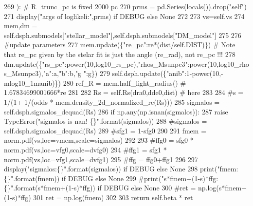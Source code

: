 \begin{DoxyCode}
269     ): \textcolor{comment}{# R\_trunc\_pc is fixed 2000 pc}
270         prms = pd.Series(locals()).drop(\textcolor{stringliteral}{"self"})
271         display(\textcolor{stringliteral}{"args of loglikeli:"},prms) \textcolor{keywordflow}{if} DEBUG \textcolor{keywordflow}{else} \textcolor{keywordtype}{None}
272         
273         vs=self.vs
274         mem,dm = self.dsph.submodels[\textcolor{stringliteral}{"stellar\_model"}],self.dsph.submodels[\textcolor{stringliteral}{"DM\_model"}]
275         
276         \textcolor{comment}{#update parameters}
277         mem.update(\{\textcolor{stringliteral}{"re\_pc"}:re*(dist/self.DIST)\}) \textcolor{comment}{# Note that re\_pc given by the stelar fit is just the
       angle (re\_rad), not re\_pc !!!}
278         dm.update(\{\textcolor{stringliteral}{"rs\_pc"}:power(10,log10\_rs\_pc),\textcolor{stringliteral}{"rhos\_Msunpc3"}:power(10,log10\_rhos\_Msunpc3),\textcolor{stringliteral}{"a"}:a,\textcolor{stringliteral}{"b"}:b,\textcolor{stringliteral}{"g
      "}:g\})
279         self.dsph.update(\{\textcolor{stringliteral}{"anib"}:1-power(10,-mlog10\_1manib)\})
280         ref\_R = mem.half\_light\_radius() \textcolor{comment}{# 1.67834699001666*re}
281         
282         Rs = self.Rs(dra0,dde0,dist) \textcolor{comment}{# here }
283         
284         \textcolor{comment}{#s = 1/(1+ 1/(odds * mem.density\_2d\_normalized\_re(Rs)))}
285         sigmalos = self.dsph.sigmalos\_dequad(Rs)
286         \textcolor{keywordflow}{if} np.any(np.isnan(sigmalos)):
287             \textcolor{keywordflow}{raise} TypeError(\textcolor{stringliteral}{"sigmalos is nan! \{\}"}.format(sigmalos))
288         \textcolor{comment}{#sigmalos = self.dsph.sigmalos\_dequad(Rs)}
289         \textcolor{comment}{#sfg1 = 1-sfg0}
290         
291         fmem = norm.pdf(vs,loc=vmem,scale=sigmalos)
292         
293         \textcolor{comment}{#ffg0 = sfg0 * norm.pdf(vs,loc=vfg0,scale=dvfg0)}
294         \textcolor{comment}{#ffg1 = sfg1 * norm.pdf(vs,loc=vfg1,scale=dvfg1)}
295         \textcolor{comment}{#ffg = ffg0+ffg1}
296         
297         display(\textcolor{stringliteral}{"sigmalos:\{\}"}.format(sigmalos)) \textcolor{keywordflow}{if} DEBUG \textcolor{keywordflow}{else} \textcolor{keywordtype}{None}
298         print(\textcolor{stringliteral}{"fmem:\{\}"}.format(fmem)) \textcolor{keywordflow}{if} DEBUG \textcolor{keywordflow}{else} \textcolor{keywordtype}{None}
299         \textcolor{comment}{#print("s*fmem+(1-s)*ffg:\{\}".format(s*fmem+(1-s)*ffg)) if DEBUG else None}
300         \textcolor{comment}{#ret = np.log(s*fmem+(1-s)*ffg)}
301         ret = np.log(fmem)
302         
303         \textcolor{keywordflow}{return} self.beta * ret
\end{DoxyCode}
